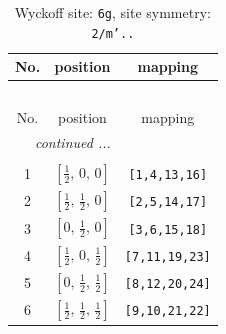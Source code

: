 \documentclass[fleqn,8pt]{jsarticle}
\begin{document}
\renewcommand{\arraystretch}{1.2}
\begin{longtable}{ccc}
\caption{Wyckoff site: {\tt 6g}, site symmetry: {\tt 2/m'..}}
 \\
 \hline \hline
No. & position & mapping \\ \hline \endfirsthead

\multicolumn{2}{l}{\tablename\ \thetable{}} \\
 \hline \hline
No. & position & mapping \\ \hline \endhead

 \hline \hline
\multicolumn{2}{r}{\footnotesize\it continued ...} \\ \endfoot

 \hline \hline
\multicolumn{2}{r}{} \\ \endlastfoot

1 & $\left[ \frac{1}{2},\, 0,\, 0 \right]$ & {\tt [1,4,13,16]} \\ \hline
2 & $\left[ \frac{1}{2},\, \frac{1}{2},\, 0 \right]$ & {\tt [2,5,14,17]} \\ \hline
3 & $\left[ 0,\, \frac{1}{2},\, 0 \right]$ & {\tt [3,6,15,18]} \\ \hline
4 & $\left[ \frac{1}{2},\, 0,\, \frac{1}{2} \right]$ & {\tt [7,11,19,23]} \\ \hline
5 & $\left[ 0,\, \frac{1}{2},\, \frac{1}{2} \right]$ & {\tt [8,12,20,24]} \\ \hline
6 & $\left[ \frac{1}{2},\, \frac{1}{2},\, \frac{1}{2} \right]$ & {\tt [9,10,21,22]} \\
\end{longtable}
\renewcommand{\arraystretch}{1.2}
\end{document}
